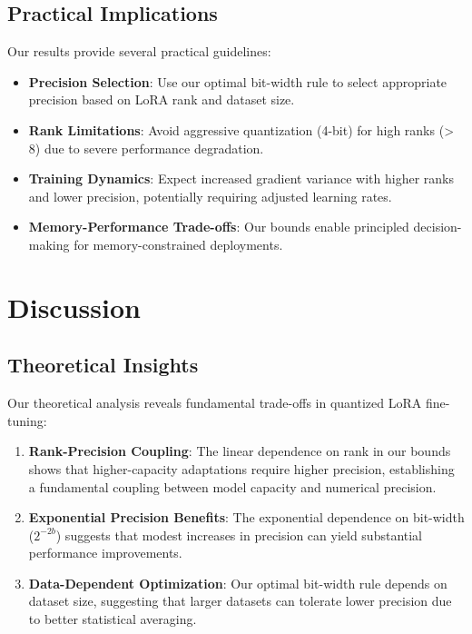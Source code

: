 \documentclass[10pt,twocolumn]{article}
\begin{document}
\subsection{Practical Implications}

Our results provide several practical guidelines:

\begin{itemize}
\item \textbf{Precision Selection}: Use our optimal bit-width rule to select appropriate precision based on LoRA rank and dataset size.

\item \textbf{Rank Limitations}: Avoid aggressive quantization (4-bit) for high ranks (> 8) due to severe performance degradation.

\item \textbf{Training Dynamics}: Expect increased gradient variance with higher ranks and lower precision, potentially requiring adjusted learning rates.

\item \textbf{Memory-Performance Trade-offs}: Our bounds enable principled decision-making for memory-constrained deployments.
\end{itemize}

\section{Discussion}

\subsection{Theoretical Insights}

Our theoretical analysis reveals fundamental trade-offs in quantized LoRA fine-tuning:

\begin{enumerate}
\item \textbf{Rank-Precision Coupling}: The linear dependence on rank in our bounds shows that higher-capacity adaptations require higher precision, establishing a fundamental coupling between model capacity and numerical precision.

\item \textbf{Exponential Precision Benefits}: The exponential dependence on bit-width ($2^{-2b}$) suggests that modest increases in precision can yield substantial performance improvements.

\item \textbf{Data-Dependent Optimization}: Our optimal bit-width rule depends on dataset size, suggesting that larger datasets can tolerate lower precision due to better statistical averaging.
\end{enumerate}
\end{document}

